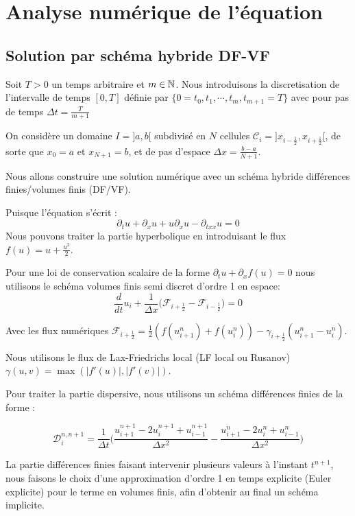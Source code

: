 \chapter{Analyse numérique de l'équation}
\section{Solution par schéma hybride DF-VF}

Soit $T > 0$ un temps arbitraire et $m \in \mathbb{N}$. Nous introduisons la discretisation de l'intervalle de temps $[0,T]$ définie par $\{0=t_0, t_1, \cdots, t_{m}, t_{m+1}=T \}$ avec pour pas de temps
$\Delta t = \frac{T}{m+1}$

On considère un domaine $I = ]a,b[$ subdivisé en $N$ cellules $\mathcal{C}_i = ]x_{i-\frac{1}{2}},x_{i+\frac{1}{2}}[$, de sorte que $x_0 = a$ et $x_{N+1} = b$, et de pas d'espace $\Delta x = \frac{b -a}{N+1}$.

\vspace{1em}

Nous allons construire une solution numérique avec un schéma hybride différences finies/volumes finis (DF/VF).

Puisque l'équation s'écrit :
$$\partial_tu + \partial_xu + u\partial_xu - \partial_{txx}u = 0$$
Nous pouvons traiter la partie hyperbolique en introduisant le flux $f(u) = u + \frac{u^2}{2}$.

Pour une loi de conservation scalaire de la forme $\partial_t u + \partial_x f(u) = 0$ nous utilisons le schéma volumes finis semi discret d'ordre 1 en espace:
$$ \frac{d }{dt} u_i + \frac{1}{\Delta x} \bigl( \mathcal{F}_{i+\frac{1}{2}} - \mathcal{F}_{i - \frac{1}{2}} \bigr) = 0$$

Avec les flux numériques $\mathcal{F}_{i+\frac{1}{2}} = \frac{1}{2}(f(u_{i+1}^n) + f(u_i^n)) - \gamma_{i+\frac{1}{2}}(u_{i+1}^n - u_{i}^n)$.


Nous utilisons le flux de Lax-Friedrichs local (LF local ou Rusanov) $\gamma(u,v) = \max(|f'(u)|,|f'(v)|)$.

\vspace{1em}

Pour traiter la partie dispersive, nous utilisons un schéma différences finies de la forme :

$$\mathcal{D}_i^{n,n+1} = \frac{1}{\Delta t} \Biggl( \frac{u_{i+1}^{n+1} - 2u_i^{n+1} + u_{i-1}^{n+1}}{\Delta x^2} - \frac{u_{i+1}^{n} - 2u_i^{n} + u_{i-1}^n}{\Delta x^2}\Biggr) $$

La partie différences finies faisant intervenir plusieurs valeurs à l'instant $t^{n+1}$, nous faisons le choix d'une approximation d'ordre 1 en temps explicite (Euler explicite) pour le terme en volumes finis, afin d'obtenir au final un schéma implicite.

